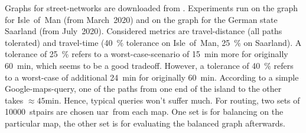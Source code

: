     Graphs for street-networks are downloaded from \cite{osm}.
    Experiments run on the graph for Isle~of~Man (from March~2020) and on the graph for the German state Saarland (from July~2020).
    Considered \glspl{metric} are travel-distance (all paths tolerated) and travel-time (\si{40 \percent} tolerance on Isle~of~Man, \si{25 \percent} on Saarland).
    A tolerance of \si{25 \percent} refers to a worst-case-scenario of \si{15 \minute} more for originally \si{60 \minute}, which seems to be a good tradeoff.
    However, a tolerance of \si{40 \percent} refers to a worst-case of additional \si{24 \minute} for originally \si{60 \minute}.
    According to a simple Google-maps-query, one of the paths from one end of the island to the other takes $\approx \si{45 \minute}$.
    Hence, typical queries won't suffer much.
    For routing, two sets of \num{10000}~\glspl{stpair} are chosen \gls{uar}\ from each map. One set is for \gls{balancing} on the particular map, the other set is for evaluating the balanced graph afterwards. 


